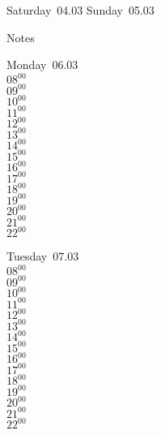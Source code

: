 \documentclass[11pt,a4paper]{book}\usepackage[]{graphicx}\usepackage[]{color}
\begin{document}
\begin{weekendbox}
  Saturday~04.03
  \tcblower
  Sunday~05.03
\end{weekendbox} %
\begin{notebox}
  Notes
\end{notebox}
\clearpage
\begin{headerbox}
\end{headerbox}
\begin{weekdaybox}
  Monday~06.03\\
  { 
  \vfill
  $08^{00}$\\
$09^{00}$\\
$10^{00}$\\
$11^{00}$\\
$12^{00}$\\
$13^{00}$\\
$14^{00}$\\
$15^{00}$\\
$16^{00}$\\
$17^{00}$\\
$18^{00}$\\
$19^{00}$\\
$20^{00}$\\
$21^{00}$\\
$22^{00}$\\
  }
\end{weekdaybox}
\begin{weekdaybox}
  Tuesday~07.03\\
  { 
  \vfill
  $08^{00}$\\
$09^{00}$\\
$10^{00}$\\
$11^{00}$\\
$12^{00}$\\
$13^{00}$\\
$14^{00}$\\
$15^{00}$\\
$16^{00}$\\
$17^{00}$\\
$18^{00}$\\
$19^{00}$\\
$20^{00}$\\
$21^{00}$\\
$22^{00}$\\
  }
\end{weekdaybox}
\end{document}
